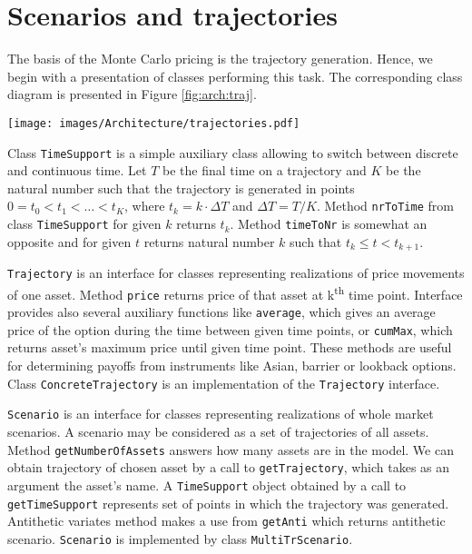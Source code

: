 \documentclass[a4paper,11pt, twoside]{book}
\theoremstyle{definition}
\theoremstyle{remark}
\begin{document}
\section{Scenarios and trajectories}
The basis of the Monte Carlo pricing is the trajectory generation. Hence, we begin with a presentation of classes performing this task. The corresponding class diagram is presented in Figure \ref{fig:arch:traj}.

\begin{sidewaysfigure}
\centering
 \texttt{[image: images/Architecture/trajectories.pdf]}
\caption{Class diagram presenting classes designated for scenario generation.}
\label{fig:arch:traj}
\end{sidewaysfigure}

Class \texttt{TimeSupport} is a simple auxiliary class allowing to switch between discrete and continuous time. Let $T$ be the final time on a trajectory and $K$ be the natural number such that the trajectory is generated in points $0 = t_0 < t_1 < \ldots < t_K$, where $t_k = k \cdot \Delta T$ and $\Delta T = T / K$. Method \texttt{nrToTime} from class \texttt{TimeSupport} for given $k$ returns $t_k$. Method \texttt{timeToNr} is somewhat an opposite and for given $t$ returns natural number $k$ such that $t_k \leq t < t_{k+1}$. 

\texttt{Trajectory} is an interface for classes representing realizations of price movements of one asset. Method \texttt{price} returns price of that asset at k\textsuperscript{th} time point. Interface provides also several auxiliary functions like \texttt{average}, which gives an average price of the option during the time between given time points, or \texttt{cumMax}, which returns asset's maximum price until given time point. These methods are useful for determining payoffs from instruments like Asian, barrier or lookback options. Class \texttt{ConcreteTrajectory} is an implementation of the \texttt{Trajectory} interface.

\texttt{Scenario} is an interface for classes representing realizations of whole market scenarios. A scenario may be considered as a set of trajectories of all assets. Method \texttt{getNumberOfAssets} answers how many assets are in the model. We can obtain trajectory of chosen asset by a call to \texttt{getTrajectory}, which takes as an argument the asset's name. A \texttt{TimeSupport} object obtained by a call to \texttt{getTimeSupport} represents set of points in which the trajectory was generated. Antithetic variates method makes a use from \texttt{getAnti} which returns antithetic scenario. \texttt{Scenario} is implemented by class \texttt{MultiTrScenario}.
\end{document}
